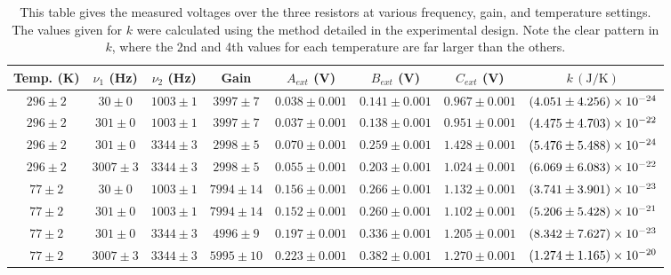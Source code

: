 \documentclass[%
 reprint,
superscriptaddress,
 amsmath,amssymb,
 aps,
]{revtex4-1}
\begin{document}
\begin{table*}[h]
\centering
\begin{tabular}{cccccccc} \hline \hline
Temp. (K) & $\nu_1$ (Hz) & $\nu_2$ (Hz) & Gain & $A_{ext}$ (V) & $B_{ext}$ (V) & $C_{ext}$ (V) & $k \,(\si{\joule/\kelvin})$ \\ \hline
$296\pm2$ & $30\pm0$ & $1003\pm1$ & $3997\pm7$ & $0.038\pm0.001$ & $0.141\pm0.001$ & $0.967\pm0.001$ & $\SI{ 4.051 \pm 4.256e-24}{}$\\
$296\pm2$ & $301\pm0$ & $1003\pm1$ & $3997\pm7$ & $0.037\pm0.001$ & $0.138\pm0.001$ & $0.951\pm0.001$ & $\SI{ 4.475 \pm 4.703e-22}{}$\\
$296\pm2$ & $301\pm0$ & $3344\pm3$ & $2998\pm5$ & $0.070\pm0.001$ & $0.259\pm0.001$ & $1.428\pm0.001$ & $\SI{ 5.476 \pm 5.488e-24}{}$\\
$296\pm2$ & $3007\pm3$ & $3344\pm3$ & $2998\pm5$ & $0.055\pm0.001$ & $0.203\pm0.001$ & $1.024\pm0.001$ & $\SI{ 6.069 \pm 6.083e-22}{}$\\
$77\pm2$ & $30\pm0$ & $1003\pm1$ & $7994\pm14$ & $0.156\pm0.001$ & $0.266\pm0.001$ & $1.132\pm0.001$ & $\SI{ 3.741 \pm 3.901e-23}{}$\\
$77\pm2$ & $301\pm0$ & $1003\pm1$ & $7994\pm14$ & $0.152\pm0.001$ & $0.260\pm0.001$ & $1.102\pm0.001$ & $\SI{ 5.206 \pm 5.428e-21}{}$\\
$77\pm2$ & $301\pm0$ & $3344\pm3$ & $4996\pm9$ & $0.197\pm0.001$ & $0.336\pm0.001$ & $1.205\pm0.001$ & $\SI{ 8.342 \pm 7.627e-23}{}$\\
$77\pm2$ & $3007\pm3$ & $3344\pm3$ & $5995\pm10$ & $0.223\pm0.001$ & $0.382\pm0.001$ & $1.270\pm0.001$ & $\SI{ 1.274 \pm 1.165e-20}{}$ \\ \hline \hline
\end{tabular}
\caption{\label{maintab} This table gives the measured voltages over the three resistors at various frequency, gain, and temperature settings. The values given for $k$ were calculated using the method detailed in the experimental design. Note the clear pattern in $k$, where the 2nd and 4th values for each temperature are far larger than the others.}
\end{table*}
\end{document}
